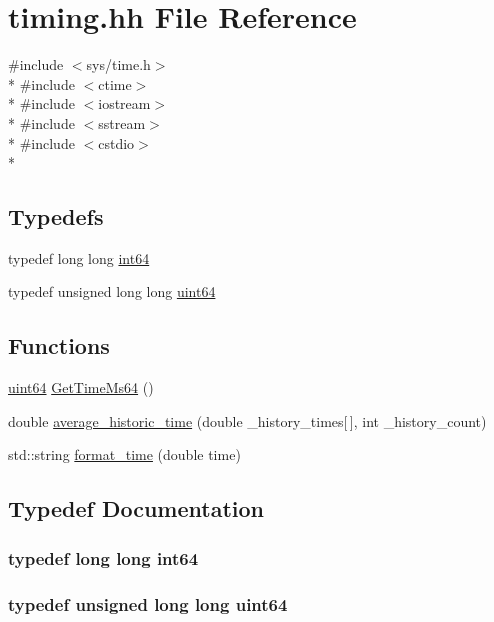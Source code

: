 \hypertarget{timing_8hh}{\section{timing.\-hh File Reference}
\label{timing_8hh}
}
{\ttfamily \#include $<$sys/time.\-h$>$}\\*
{\ttfamily \#include $<$ctime$>$}\\*
{\ttfamily \#include $<$iostream$>$}\\*
{\ttfamily \#include $<$sstream$>$}\\*
{\ttfamily \#include $<$cstdio$>$}\\*
\subsection*{Typedefs}
\begin{DoxyCompactItemize}
\item 
typedef long long \hyperlink{timing_8hh_aecfc3c54bd29ad5964e1c1c3ccbf89df}{int64}
\item 
typedef unsigned long long \hyperlink{timing_8hh_a29940ae63ec06c9998bba873e25407ad}{uint64}
\end{DoxyCompactItemize}
\subsection*{Functions}
\begin{DoxyCompactItemize}
\item 
\hyperlink{timing_8hh_a29940ae63ec06c9998bba873e25407ad}{uint64} \hyperlink{timing_8hh_a80d549c116a695a963ad5b7d193fb33e}{Get\-Time\-Ms64} ()
\item 
double \hyperlink{timing_8hh_a6b7ae6f9ca0b1d58941a5a7bd5b70554}{average\-\_\-historic\-\_\-time} (double \-\_\-history\-\_\-times\mbox{[}$\,$\mbox{]}, int \-\_\-history\-\_\-count)
\item 
std\-::string \hyperlink{timing_8hh_aab459cac7ed4df8d570398f7cd204574}{format\-\_\-time} (double time)
\end{DoxyCompactItemize}


\subsection{Typedef Documentation}
\hypertarget{timing_8hh_aecfc3c54bd29ad5964e1c1c3ccbf89df}{
\subsubsection[{int64}]{\setlength{\rightskip}{0pt plus 5cm}typedef long long {\bf int64}}}\label{timing_8hh_aecfc3c54bd29ad5964e1c1c3ccbf89df}
\hypertarget{timing_8hh_a29940ae63ec06c9998bba873e25407ad}{
\subsubsection[{uint64}]{\setlength{\rightskip}{0pt plus 5cm}typedef unsigned long long {\bf uint64}}}\label{timing_8hh_a29940ae63ec06c9998bba873e25407ad}


